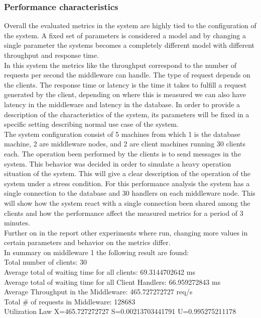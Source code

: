 \subsubsection{Performance characteristics}\label{sec:performance-characteristics-1}
Overall the evaluated metrics in the system are highly tied to the configuration of the system. A fixed set of parameters is considered a model and by changing a single parameter the systems becomes a completely different model with different throughput and response time.\\

In this system the metrics like the throughput correspond to the number of requests per second the middleware can handle. The type of request depends on the clients. The response time or latency is the time it takes to fulfill a request generated by the client, depending on where this is measured we can also have latency in the middleware and latency in the database.
In order to provide a description of the characteristics of the system, its parameters will be fixed in a specific setting describing normal use case of the system. \\

The system configuration consist of 5 machines from which 1 is the database machine, 2 are middleware nodes, and 2 are client machines running 30 clients each. The operation been performed by the clients is to send messages in the system. This behavior was decided in order to simulate a heavy operation situation of the system. This will give a clear description of the operation of the system under a stress condition. For this performance analysis the system has a single connection to the database and 30 handlers on each middleware node. This will show how the system react with a single connection been shared among the clients and how the performance affect the measured metrics for a period of 3 minutes.\\

Further on in the report other experiments where run, changing more values in certain parameters and behavior on the metrics differ.\\

In summary on middleware 1 the following result are found:\\
Total number of clients:	30\\
Average total of waiting time for all clients:	69.3144702642 ms\\
Average total of waiting time for all Client Handlers:	66.959272843 ms\\
Average Throughput in the Middleware:	465.727272727 req/s\\
Total \# of requests in Middleware:	128683\\
Utilization Law 	X=465.727272727	S=0.00213703441791 U=0.995275211178\\

